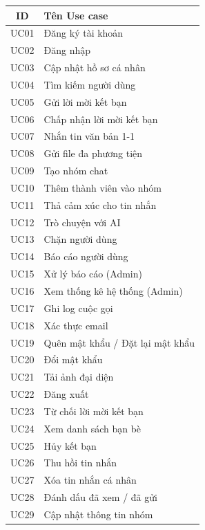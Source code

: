\documentclass[12pt,a4paper]{report}
\begin{document}
\begin{longtable}{|c|p{11cm}|}
    \hline
    \textbf{ID} & \textbf{Tên Use case} \\
    \hline
    UC01 & Đăng ký tài khoản \\
    \hline
    UC02 & Đăng nhập \\
    \hline
    UC03 & Cập nhật hồ sơ cá nhân \\
    \hline
    UC04 & Tìm kiếm người dùng \\
    \hline
    UC05 & Gửi lời mời kết bạn \\
    \hline
    UC06 & Chấp nhận lời mời kết bạn \\
    \hline
    UC07 & Nhắn tin văn bản 1-1 \\
    \hline
    UC08 & Gửi file đa phương tiện \\
    \hline
    UC09 & Tạo nhóm chat \\
    \hline
    UC10 & Thêm thành viên vào nhóm \\
    \hline
    UC11 & Thả cảm xúc cho tin nhắn \\
    \hline
    UC12 & Trò chuyện với AI \\
    \hline
    UC13 & Chặn người dùng \\
    \hline
    UC14 & Báo cáo người dùng \\
    \hline
    UC15 & Xử lý báo cáo (Admin) \\
    \hline
    UC16 & Xem thống kê hệ thống (Admin) \\
    \hline
    UC17 & Ghi log cuộc gọi \\
    \hline
    UC18 & Xác thực email \\
    \hline
    UC19 & Quên mật khẩu / Đặt lại mật khẩu \\
    \hline
    UC20 & Đổi mật khẩu \\
    \hline
    UC21 & Tải ảnh đại diện \\
    \hline
    UC22 & Đăng xuất \\
    \hline
    UC23 & Từ chối lời mời kết bạn \\
    \hline
    UC24 & Xem danh sách bạn bè \\
    \hline
    UC25 & Hủy kết bạn \\
    \hline
    UC26 & Thu hồi tin nhắn \\
    \hline
    UC27 & Xóa tin nhắn cá nhân \\
    \hline
    UC28 & Đánh dấu đã xem / đã gửi \\
    \hline
    UC29 & Cập nhật thông tin nhóm \\

\end{longtable}
\end{document}
